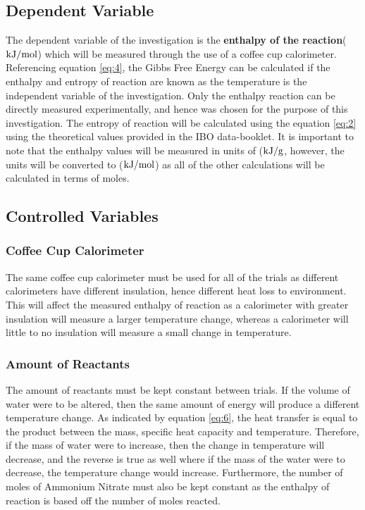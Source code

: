 \documentclass{article}
\begin{document}
\subsection{Dependent Variable}
The dependent variable of the investigation is the \textbf{enthalpy of the reaction}($\ce{kJ/mol}$) which will be measured through the use of a coffee cup calorimeter. Referencing equation \ref{eq:4}, the Gibbs Free Energy can be calculated if the enthalpy and entropy of reaction are known as the temperature is the independent variable of the investigation. Only the enthalpy reaction can be directly measured experimentally, and hence was chosen for the purpose of this investigation. The entropy of reaction will be calculated using the equation \ref{eq:2} using the theoretical values provided in the IBO data-booklet. It is important to note that the enthalpy values will be measured in units of ($\ce{kJ/g}$, however, the units will be converted to ($\ce{kJ/mol}$) as all of the other calculations will be calculated in terms of moles.

\subsection{Controlled Variables}
\subsubsection{Coffee Cup Calorimeter}
The same coffee cup calorimeter must be used for all of the trials as different calorimeters have different insulation, hence different heat loss to environment. This will affect the measured enthalpy of reaction as a calorimeter with greater insulation will measure a larger temperature change, whereas a calorimeter will little to no insulation will measure a small change in temperature.

\subsubsection{Amount of Reactants}
The amount of reactants must be kept constant between trials. If the volume of water were to be altered, then the same amount of energy will produce a different temperature change. As indicated by equation \ref{eq:6}, the heat transfer is equal to the product between the mass, specific heat capacity and temperature. Therefore, if the mass of water were to increase, then the change in temperature will decrease, and the reverse is true as well where if the mass of the water were to decrease, the temperature change would increase. Furthermore, the number of moles of Ammonium Nitrate must also be kept constant as the enthalpy of reaction is based off the number of moles reacted.
\end{document}
